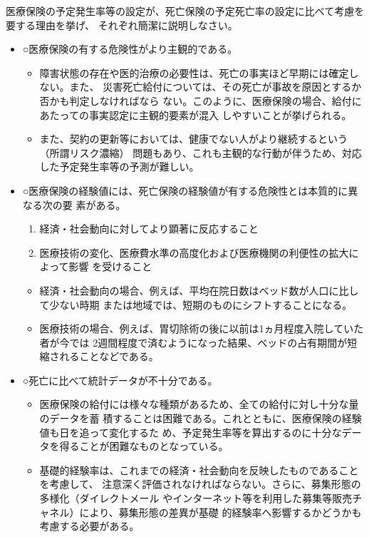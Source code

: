 \documentclass[report,gutter=10mm,fore-edge=10mm,uplatex,dvipdfmx]{jlreq}
\begin{document}
医療保険の予定発生率等の設定が、死亡保険の予定死亡率の設定に比べて考慮を要する理由を挙げ、
それぞれ簡潔に説明しなさい。
\begin{itemize}
 \item ○医療保険の有する危険性がより主観的である。
\begin{itemize}
 \item 障害状態の存在や医的治療の必要性は、死亡の事実ほど早期には確定しない。また、
災害死亡給付については、その死亡が事故を原因とするか否かも判定しなければなら
ない。このように、医療保険の場合、給付にあたっての事実認定に主観的要素が混入
しやすいことが挙げられる。
 \item また、契約の更新等においては、健康でない人がより継続するという（所謂リスク濃縮）
問題もあり、これも主観的な行動が伴うため、対応した予定発生率等の予測が難しい。
\end{itemize}
 \item ○医療保険の経験値には、死亡保険の経験値が有する危険性とは本質的に異なる次の要
素がある。
\begin{enumerate}
 \item 経済・社会動向に対してより顕著に反応すること
 \item 医療技術の変化、医療費水準の高度化および医療機関の利便性の拡大によって影響
を受けること
\end{enumerate}
\begin{itemize}
 \item 経済・社会動向の場合、例えば、平均在院日数はベッド数が人口に比して少ない時期
または地域では、短期のものにシフトすることになる。
 \item 医療技術の場合、例えば、胃切除術の後に以前は1ヵ月程度入院していた者が今では
2週間程度で済むようになった結果、ベッドの占有期間が短縮されることなどである。
\end{itemize}
 \item ○死亡に比べて統計データが不十分である。
\begin{itemize}
 \item 医療保険の給付には様々な種類があるため、全ての給付に対し十分な量のデータを蓄
積することは困難である。これとともに、医療保険の経験値も日を追って変化するた
め、予定発生率等を算出するのに十分なデータを得ることが困難なものとなっている。
 \item 基礎的経験率は、これまでの経済・社会動向を反映したものであることを考慮して、
注意深く評価されなければならない。さらに、募集形態の多様化（ダイレクトメール
やインターネット等を利用した募集等販売チャネル）により、募集形態の差異が基礎
的経験率へ影響するかどうかも考慮する必要がある。
\end{itemize}
\end{itemize}
\end{document}
